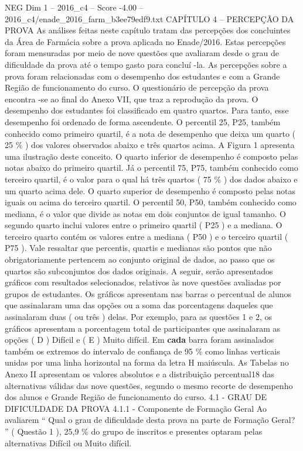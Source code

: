 \begin{textsample}{NEG Dim 1 – 2016\_c4 – Score -4.00 – 2016\_c4/enade\_2016\_farm\_b3ee79edf9.txt}  \label{ex:f1_neg_157}
CAPÍTULO 4 – PERCEPÇÃO DA PROVA As análises feitas neste capítulo tratam das percepções dos concluintes da Área de Farmácia sobre a prova aplicada no Enade/2016.
Estas percepções foram mensuradas por meio de nove questões que avaliaram desde o grau de dificuldade da prova até o tempo gasto para concluí -la.
As percepções sobre a prova foram relacionadas com o desempenho dos estudantes e com a Grande Região de funcionamento do curso.
O questionário de percepção da prova encontra -se ao final do Anexo VII, que traz a reprodução da prova.
O desempenho dos estudantes foi classificado em quatro quartos.
Para tanto, esse desempenho foi ordenado de forma ascendente.
O percentil 25, P25, também conhecido como primeiro quartil, é a nota de desempenho que deixa um quarto ( 25 \% ) dos valores observados abaixo e três quartos acima.
A Figura 1 apresenta uma ilustração deste conceito.
O quarto inferior de desempenho é composto pelas notas abaixo do primeiro quartil.
Já o percentil 75, P75, também conhecido como terceiro quartil, é o valor para o qual há três quartos ( 75 \% ) dos dados abaixo e um quarto acima dele.
O quarto superior de desempenho é composto pelas notas iguais ou acima do terceiro quartil.
O percentil 50, P50, também conhecido como mediana, é o valor que divide as notas em dois conjuntos de igual tamanho.
O segundo quarto inclui valores entre o primeiro quartil ( P25 ) e a mediana.
O terceiro quarto contém os valores entre a mediana ( P50 ) e o terceiro quartil ( P75 ).
Vale ressaltar que percentis, quartis e medianas são pontos que não obrigatoriamente pertencem ao conjunto original de dados, ao passo que os quartos são subconjuntos dos dados originais.
A seguir, serão apresentados gráficos com resultados selecionados, relativos às nove questões avaliadas por grupos de estudantes.
Os gráficos apresentam nas barras o percentual de alunos que assinalaram uma das opções ou a soma das porcentagens daqueles que assinalaram duas ( ou três ) delas.
Por exemplo, para as questões 1 e 2, os gráficos apresentam a porcentagem total de participantes que assinalaram as opções ( D ) Difícil e ( E ) Muito difícil.
Em \textbf{cada} barra foram assinalados também os extremos do intervalo de confiança de 95 \% como linhas verticais unidas por uma linha horizontal na forma da letra H maiúscula.
As Tabelas no Anexo II apresentam os valores absolutos e a distribuição percentual18 das alternativas válidas das nove questões, segundo o mesmo recorte de desempenho dos alunos e Grande Região de funcionamento do curso. 4.1 - GRAU DE DIFICULDADE DA PROVA 4.1.1 - Componente de Formação Geral Ao avaliarem “ Qual o grau de dificuldade desta prova na parte de Formação Geral? ” ( Questão 1 ), 25,9 \% do grupo de inscritos e presentes optaram pelas alternativas Difícil ou Muito difícil.

\end{textsample}
